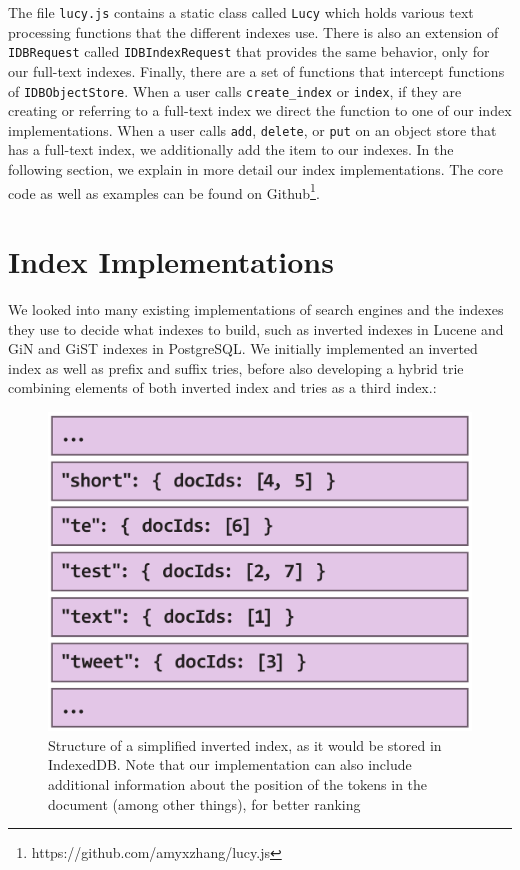 \documentclass{vldb}
\begin{document}
The file \texttt{lucy.js} contains a static class called \texttt{Lucy} which holds various text processing functions that the different indexes use. There is also an extension of \texttt{IDBRequest} called \texttt{IDBIndexRequest} that provides the same behavior, only for our full-text indexes. Finally, there are a set of functions that intercept functions of \texttt{IDBObjectStore}. When a user calls \texttt{create\_index} or \texttt{index}, if they are creating or referring to a full-text index we direct the function to one of our index implementations. When a user calls \texttt{add},  \texttt{delete}, or \texttt{put} on an object store that has a full-text index, we additionally add the item to our indexes. In the following section, we explain in more detail our index implementations.
The core code as well as examples can be found on Github\footnote{https://github.com/amyxzhang/lucy.js}.


\section{Index Implementations}

We looked into many existing implementations of search engines and the indexes they use to decide what indexes to build, such as inverted indexes in Lucene and GiN and GiST indexes in PostgreSQL. We initially implemented an inverted index as well as prefix and suffix tries, before also developing a hybrid trie combining elements of both inverted index and tries as a third index.:

\begin{figure}
  \centering
   \includegraphics[scale=.35]{inverted-index}
  \caption{Structure of a simplified inverted index, as it would be stored in IndexedDB. Note that our implementation can also include additional information about the position of the tokens in the document (among other things), for better ranking}
\label{invindex}
\end{figure}
\end{document}
